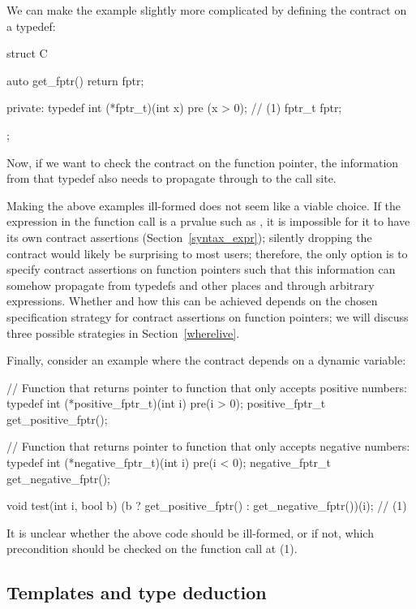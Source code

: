 We can make the example slightly more complicated by defining the contract on a typedef:
\begin{codeblock}
struct C {
  auto get_fptr() { return fptr; }
  
private:
  typedef int (*fptr_t)(int x) pre (x > 0);  // (1)
  fptr_t fptr;
};
\end{codeblock}
Now, if  we want to check the contract on the function pointer, the information from that typedef also needs to propagate through to the call site.

Making the above examples ill-formed does not seem like a viable choice. If the expression in the function call is a prvalue such as , it is impossible for it to have its own contract assertions (Section~\ref{syntax_expr}); silently dropping the contract would likely be surprising to most users; therefore, the only option is to specify contract assertions on function pointers such that this information can somehow propagate from typedefs and other places and through arbitrary expressions. Whether and how this can be achieved depends on the chosen specification strategy for contract assertions on function pointers; we will discuss three possible strategies in Section~\ref{wherelive}.

Finally, consider an example where the contract depends on a dynamic variable:
\begin{codeblock}
// Function that returns pointer to function that only accepts positive numbers:
typedef int (*positive_fptr_t)(int i) pre(i > 0);
positive_fptr_t get_positive_fptr();

// Function that returns pointer to function that only accepts negative numbers:
typedef int (*negative_fptr_t)(int i) pre(i < 0);
negative_fptr_t get_negative_fptr();

void test(int i, bool b) {
  (b ? get_positive_fptr() : get_negative_fptr())(i);  // (1)
}
\end{codeblock}
It is unclear whether the above code should be ill-formed, or if not, which precondition should be checked on the function call at (1).


\subsection{Templates and type deduction}
\label{semantic_templates}

